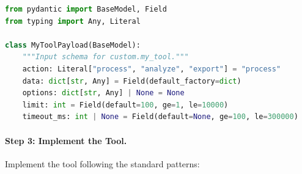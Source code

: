 \begin{lstlisting}[language=Python, caption={Tool payload schema definition}, label={lst:tool-schema}]
from pydantic import BaseModel, Field
from typing import Any, Literal

class MyToolPayload(BaseModel):
    """Input schema for custom.my_tool."""
    action: Literal["process", "analyze", "export"] = "process"
    data: dict[str, Any] = Field(default_factory=dict)
    options: dict[str, Any] | None = None
    limit: int = Field(default=100, ge=1, le=10000)
    timeout_ms: int | None = Field(default=None, ge=100, le=300000)
\end{lstlisting}

\paragraph{Step 3: Implement the Tool.}
Implement the tool following the standard patterns:

